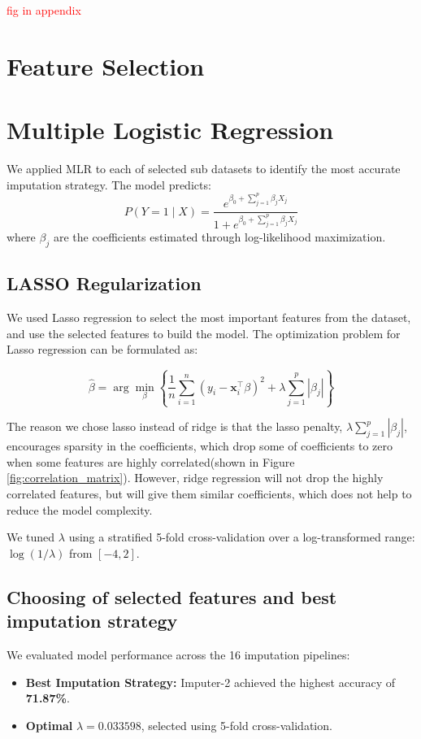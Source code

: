\textcolor{red}{fig in appendix}

\section{Feature Selection}

\section{Multiple Logistic Regression}

We applied MLR to each of selected sub datasets to identify the most accurate imputation strategy. The model predicts:
\[
P(Y = 1 \mid X) = \frac{e^{\beta_0 + \sum_{j=1}^{p} \beta_j X_j}}{1 + e^{\beta_0 + \sum_{j=1}^{p} \beta_j X_j}}
\]
where \( \beta_j \) are the coefficients estimated through log-likelihood maximization.

\subsection{LASSO Regularization}

We used Lasso regression to select the most important features from the dataset, and use the selected features to build the model.
The optimization problem for Lasso regression can be formulated as:

\[
\hat{\beta} = \arg\min_{\beta} \left\{ \frac{1}{n} \sum_{i=1}^n \left( y_i - \mathbf{x}_i^\top \beta \right)^2 + \lambda \sum_{j=1}^p |\beta_j| \right\}
\]

The reason we chose lasso instead of ridge is that the lasso penalty, \( \lambda \sum_{j=1}^p |\beta_j| \), encourages sparsity in the coefficients, 
which drop some of coefficients to zero when some features are highly correlated(shown in Figure \ref{fig:correlation_matrix}). However, ridge regression will not 
drop the highly correlated features, but will give them similar coefficients, which does not help to reduce the model complexity.

We tuned $\lambda$ using a stratified 5-fold cross-validation over a log-transformed range: $\log(1/\lambda)$ from $[-4, 2]$.

\subsection{Choosing of selected features and best imputation strategy}

We evaluated model performance across the 16 imputation pipelines:
\begin{itemize}
    \item \textbf{Best Imputation Strategy:} Imputer-2 achieved the highest accuracy of \textbf{71.87\%}.
    \item \textbf{Optimal} \( \lambda = 0.033598 \), selected using 5-fold cross-validation.
\end{itemize}

